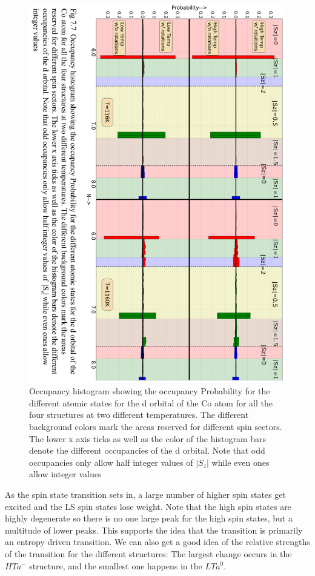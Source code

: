 \documentclass[10pt]{ruthesis}
\begin{document}
{\begin{figure}[H]
\includegraphics[width=\columnwidth]{hist_final_flipped.png}
\captionsetup{textformat=empty,labelformat=blank}
\caption{Occupancy histogram showing the occupancy Probability for the different atomic states for the d orbital of the Co atom for all the four structures at two different temperatures. The different background colors mark the areas reserved for different spin sectors.  The lower x axis ticks as well as the color of the histogram bars denote the different occupancies of the d orbital. Note that odd occupancies only allow half integer values of $|S_z|$ while even ones allow integer values}
\end{figure}

\setcounter{figure}{7}
As the spin state transition sets in, a large number of higher spin states get excited and the LS spin states lose weight. Note that the high spin states are highly degenerate so there is no one large peak for the high spin states, but a multitude of lower peaks. This supports the idea that the transition is primarily an entropy driven transition. We can also get a good idea of the relative strengths of the transition for the different structures: The largest change occurs in the $HTa^-$ structure, and the smallest one happens in the $LTa^0$. 

}
\end{document}
